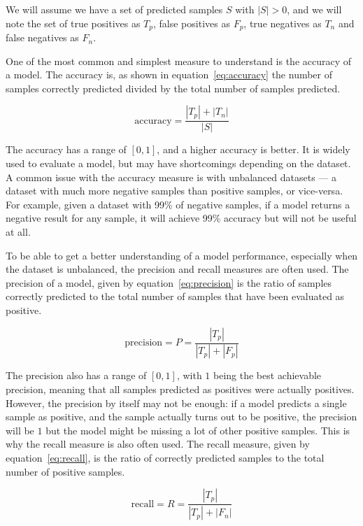 We will assume we have a set of predicted samples $S$ with $|S| > 0$, and we
will note the set of true positives as $T_p$, false positives as $F_p$, true
negatives as $T_n$ and false negatives as $F_n$.

One of the most common and simplest measure to understand is the accuracy of a
model. The accuracy is, as shown in equation~\ref{eq:accuracy} the number of
samples correctly predicted divided by the total number of samples predicted.

\begin{equation}
  \label{eq:accuracy}
  \text{accuracy} = \frac{|T_p| + |T_n|}{|S|}
\end{equation}

The accuracy has a range of $[0, 1]$, and a higher accuracy is better.
It is widely used to evaluate a model, but may have shortcomings depending on
the dataset. A common issue with the accuracy measure is with unbalanced
datasets --- a dataset with much more negative samples than positive samples, or
vice-versa. For example, given a dataset with 99\% of negative samples, if a
model returns a negative result for any sample, it will achieve 99\% accuracy
but will not be useful at all.

To be able to get a better understanding of a model performance, especially when
the dataset is unbalanced, the precision and recall measures are often used. The
precision of a model, given by equation~\ref{eq:precision} is the ratio of
samples correctly predicted to the total number of samples that have been
evaluated as positive.

\begin{equation}
  \label{eq:precision}
  \text{precision} = P = \frac{|T_p|}{|T_p| + |F_p|}
\end{equation}

The precision also has a range of $[0, 1]$, with $1$ being the best achievable
precision, meaning that all samples predicted as positives were actually
positives. However, the precision by itself may not be enough: if a model
predicts a single sample as positive, and the sample actually turns out to be
positive, the precision will be $1$ but the model might be missing a lot of
other positive samples. This is why the recall measure is also often used. The
recall measure, given by equation~\ref{eq:recall}, is the ratio of correctly
predicted samples to the total number of positive samples.

\begin{equation}
  \label{eq:recall}
  \text{recall} = R = \frac{|T_p|}{|T_p| + |F_n|}
\end{equation}

